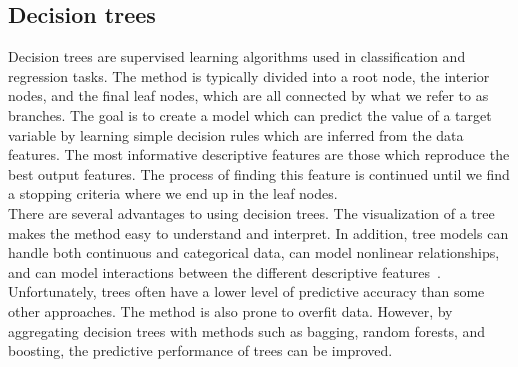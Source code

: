 \documentclass[reprint,english,notitlepage]{revtex4-1}  %
\begin{document}
\subsection{Decision trees}
Decision trees are supervised learning algorithms used in classification and regression tasks. The method is typically divided into a root node, the interior nodes, and the final leaf nodes, which are all connected by what we refer to as branches. 
The goal is to create a model which can predict the value of a target variable by learning simple decision rules which are inferred from the data features. The most informative descriptive features are those which reproduce the best output features. The process of finding this feature is continued until we find a stopping criteria where we end up in the leaf nodes. 
\vspace{3mm}
\\ 
There are several advantages to using decision trees. The visualization of a tree makes the method easy to understand and interpret. In addition, tree models can handle both continuous and categorical data, can model nonlinear relationships, and can model interactions between the different descriptive features~\cite{morten}. 
Unfortunately, trees often have a lower level of predictive accuracy than some other approaches. The method is also prone to overfit data. However, by aggregating decision trees with methods such as bagging, random forests, and boosting, the predictive performance of trees can be improved. 
\end{document}
